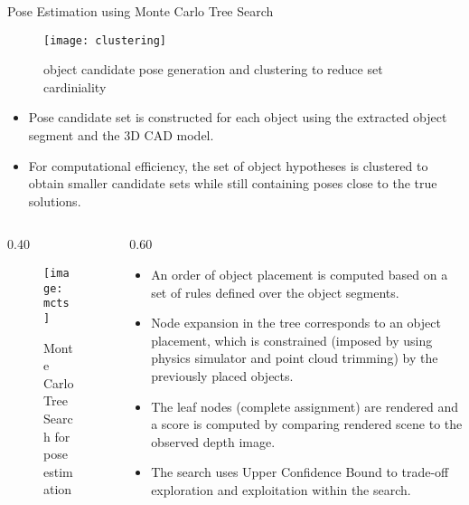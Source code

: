 \begin{columns}[t]
	\begin{column}{0.70\textwidth}
		\begin{block}{\large Pose Estimation using Monte Carlo Tree Search}
			\centering
			\begin{figure}[h]
				\texttt{[image: clustering]}
				\caption{object candidate pose generation and clustering to reduce set cardiniality}
			\end{figure}
			\vspace{-0.3in}
			\begin{itemize}
				\item Pose candidate set is constructed for each object using the extracted object segment and the 3D CAD model.
				\item For computational efficiency, the set of object hypotheses is clustered to obtain smaller candidate sets while still containing poses close to the true solutions. 
			\end{itemize}
			\vspace{-0.3in}
			\begin{columns}[t]
			\begin{column} {0.40\textwidth}
			\begin{figure}[h]
				\texttt{[image: mcts]}
				\caption{Monte Carlo Tree Search for pose estimation}
			\end{figure}
			\end{column}
			\begin{column} {0.60\textwidth}
			\begin{itemize}
				\item An order of object placement is computed based on a set of rules defined over the object segments.
				\item Node expansion in the tree corresponds to an object placement, which is constrained (imposed by using physics simulator and point cloud trimming) by the previously placed objects.
				\item The leaf nodes (complete assignment) are rendered and a score is computed by comparing rendered scene to the observed depth image.
				\item The search uses Upper Confidence Bound to trade-off exploration and exploitation within the search.
			\end{itemize}
			\end{column}
			\end{columns}
		\end{block}

\end{column}
\end{columns}
